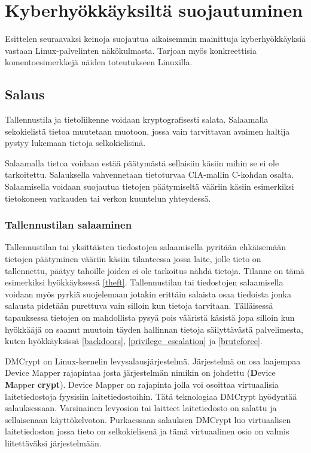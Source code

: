 \chapter{Kyberhyökkäyksiltä suojautuminen}\label{suojautuminen}

Esittelen seuraavaksi keinoja suojautua aikaisemmin mainittuja kyberhyökkäyksiä vastaan Linux-palvelinten näkökulmasta. Tarjoan myös konkreettisia komentoesimerkkejä näiden toteutukseen Linuxilla.

\section{Salaus}\label{Salaus}
Tallennustila ja tietoliikenne voidaan kryptografisesti salata. Salaamalla sekokielistä tietoa muutetaan muotoon, jossa vain tarvittavan avaimen haltija pystyy lukemaan tietoja selkokielisinä.

Salaamalla tietoa voidaan estää päätymästä sellaisiin käsiin mihin se ei ole tarkoitettu. Salauksella vahvennetaan tietoturvaa CIA-mallin C-kohdan osalta. Salaamisella voidaan suojautua tietojen päätymiseltä vääriin käsiin esimerkiksi tietokoneen varkauden tai verkon kuuntelun yhteydessä.~\cite{stamp2011information}

\subsection{Tallennustilan salaaminen}\label{tallennustilan_salaaminen}
Tallennustilan tai yksittäisten tiedostojen salaamisella pyritään ehkäisemään tietojen päätyminen vääriin käsiin tilanteessa jossa laite, jolle tieto on tallennettu, päätyy tahoille joiden ei ole tarkoitus nähdä tietoja. Tilanne on tämä esimerkiksi hyökkäyksessä \ref{theft}. Tallennustilan tai tiedostojen salaamisella voidaan myös pyrkiä suojelemaan jotakin erittäin salaista osaa tiedoista jonka salausta pidetään purettuva vain silloin kun tietoja tarvitaan. Tälläisessä tapauksessa tietojen on mahdollista pysyä pois vääristä käsistä jopa silloin kun hyökkääjä on saanut muutoin täyden hallinnan tietoja säilyttävästä palvelimesta, kuten hyökkäyksissä \ref{backdoors}, \ref{privilege_escalation} ja \ref{bruteforce}.~\cite{stamp2011information}

DMCrypt on Linux-kernelin levysalausjärjestelmä. Järjestelmä on osa laajempaa Device Mapper rajapintaa josta järjestelmän nimikin on johdettu (\textbf{D}evice \textbf{M}apper \textbf{crypt}). Device Mapper on rajapinta jolla voi osoittaa virtuaalisia laitetiedostoja fyysisiin laitetiedostoihin. Tätä teknologiaa DMCrypt hyödyntää salauksessaan. Varsinainen levyosion tai laitteet laitetiedosto on salattu ja sellaisenaan käyttökelvoton. Purkaessaan salauksen DMCrypt luo virtuaalisen laitetiedoston jossa tieto on selkokielisenä ja tämä virtuaalinen osio on valmis liitettäväksi järjestelmään.

